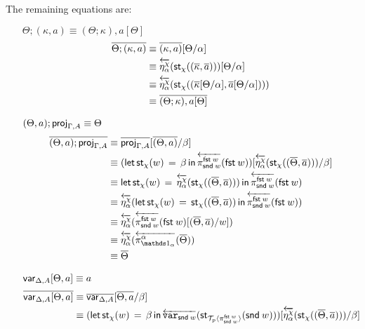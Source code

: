 \documentclass[10pt]{article}
\theoremstyle{definition}
\newcommand\dsd[1]{\ensuremath{\mathsf{#1}}}
\newcommand{\app}[2]{\ensuremath{#1 \: #2}}
\newcommand{\fst}[1]{\app{\dsd{fst}}{#1}}
\newcommand{\snd}[1]{\app{\dsd{snd}}{#1}}
\newcommand{\rewrite}[2]{\overleftarrow{#1}(#2)}
\newcommand\StI[2]{\ensuremath{\mathsf{st}_{#1}(#2)}}
\newcommand\StE[4]{\ensuremath{\mathsf{let} \, \StI{#1}{#3} \, = \, {#2} \, \mathsf{in} \, #4}}
\newcommand\ApEl[2]{\mathcal{T}_{#1}\langle#2\rangle}
\begin{document}
The remaining equations are:

\begin{enumerate}[style = multiline, labelwidth = 80pt]
\item[{$\Theta ; (\kappa , a) \equiv (\Theta ; \kappa) , a[\Theta]$}] 
\begin{align*}
\upstairs{\Theta ; (\kappa , a)}
&\equiv \upstairs{(\kappa, a)}[\Theta/\alpha] \\
&\equiv \rewrite{\eta^\chi_{\alpha}}{\StI{\chi}{(\upstairs{\kappa}, \upstairs{a})}}[\Theta/\alpha] \\
&\equiv \rewrite{\eta^\chi_{\alpha}}{\StI{\chi}{(\upstairs{\kappa}[\Theta/\alpha], \upstairs{a}[\Theta/\alpha])}} \\
&\equiv \upstairs{(\Theta ; \kappa) , a[\Theta]}
\end{align*}
\item[{$(\Theta, a);\mathsf{proj}_{\Gamma,A} \equiv \Theta$}]
\begin{align*}
\upstairs{(\Theta, a);\proj{\Gamma,A}}
&\equiv \upstairs{\proj{\Gamma,A}}[\upstairs{(\Theta, a)}/\beta] \\
&\equiv (\StE{\chi}{\beta}{w}{\rewrite{\pi^{\fst w}_{\snd w}}{\fst w}})[\rewrite{\eta^\chi_{\alpha}}{\StI{\chi}{(\upstairs{\Theta}, \upstairs{a})}}/\beta] \\
&\equiv \StE{\chi}{\rewrite{\eta^\chi_{\alpha}}{\StI{\chi}{(\upstairs{\Theta}, \upstairs{a})}}}{w}{\rewrite{\pi^{\fst w}_{\snd w}}{\fst w}} \\
&\equiv \rewrite{\eta^\chi_{\alpha}}{\StE{\chi}{\StI{\chi}{(\upstairs{\Theta}, \upstairs{a})}}{w}{\rewrite{\pi^{\fst w}_{\snd w}}{\fst w}}} \\
&\equiv \rewrite{\eta^\chi_{\alpha}}{\rewrite{\pi^{\fst w}_{\snd w}}{\fst w}[(\upstairs{\Theta}, \upstairs{a})/w]} \\
&\equiv \rewrite{\eta^\chi_{\alpha}}{\rewrite{\pi^\alpha_{\One_\alpha}}{\upstairs{\Theta}}} \\
&\equiv\upstairs{\Theta} 
\end{align*}
\item[{$\mathsf{var}_{\Delta,A}[\Theta, a] \equiv a$}] 
\begin{align*}
\upstairs{\qvar{\Delta,A}[\Theta, a]} 
&\equiv \upstairs{\qvar{\Delta,A}}[\upstairs{\Theta, a}/\beta] \\
&\equiv (\StE{\chi}{\beta}{w}{\rewrite{\var{\snd w}}{\StI{\ApEl{p}{\pi^{\fst w}_{\snd w}}}{\snd w}}})[\rewrite{\eta^\chi_{\alpha}}{\StI{\chi}{(\upstairs{\Theta}, \upstairs{a})}}/\beta] \\

\end{align*}
\end{enumerate}
\end{document}
